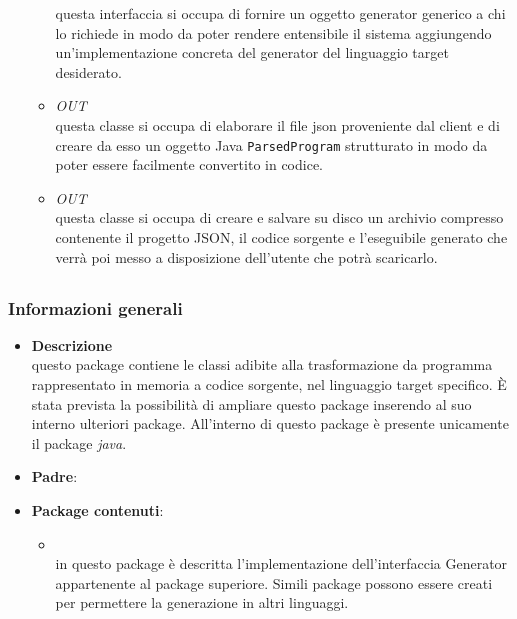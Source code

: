 \begin{itemize}
\begin{itemize}
questa interfaccia si occupa di fornire un oggetto generator generico a chi lo richiede in modo da poter rendere entensibile il sistema aggiungendo un'implementazione concreta del generator del linguaggio target desiderato.
\item \textit{OUT} \hyperref[\nogloxy{SWEDesigner::Server::Parser::Parser}]{}\\
questa classe si occupa di elaborare il file json proveniente dal client e di creare da esso un oggetto Java \texttt{ParsedProgram} strutturato in modo da poter essere facilmente convertito in codice.
\item \textit{OUT} \hyperref[\nogloxy{SWEDesigner::Server::Utility::Compressor}]{}\\
questa classe si occupa di creare e salvare su disco un archivio compresso contenente il progetto JSON, il codice sorgente e l'eseguibile generato che verrà poi messo a disposizione dell'utente che potrà scaricarlo.
\end{itemize}
\end{itemize}
\subsection{}
\label{\nogloxy{SWEDesigner::Server::Generator}}
\subsubsection{Informazioni generali}
\begin{itemize}
\item \textbf{Descrizione}\\
questo package contiene le classi adibite alla trasformazione da programma rappresentato in memoria a codice sorgente, nel linguaggio target specifico. È stata prevista la possibilità di ampliare questo package inserendo al suo interno ulteriori package. All'interno di questo package è presente unicamente il package \emph{java}.
\item \textbf{Padre}: \hyperref[\nogloxy{SWEDesigner::Server}]{}
\item \textbf{Package contenuti}:
\begin{itemize}
\item \hyperref[\nogloxy{SWEDesigner::Server::Generator::Java}]{}\\
in questo package è descritta l'implementazione dell'interfaccia Generator appartenente al package superiore. Simili package possono essere creati per permettere la generazione in altri linguaggi.
\end{itemize}
\end{itemize}
